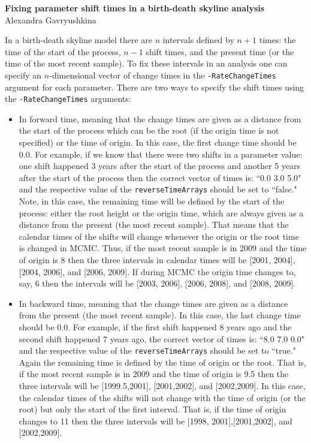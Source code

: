 \documentclass[12pt]{article}
\begin{document}
\begin{center}
\large{\bf Fixing parameter shift times in a birth-death skyline analysis} \\
\vskip2mm 
Alexandra Gavryushkina
\end{center}
\vskip5mm

In a birth-death skyline model \cite{Stadler2013} there are $n$ intervals defined by $n+1$ times: the time of the start of the process, $n-1$ shift times, and the present time (or the time of the most recent sample). To fix these intervals in an analysis one can specify an $n$-dimensional vector of change times in the {\tt -RateChangeTimes} argument for each parameter.  There are two ways to specify the shift times using the {\tt -RateChangeTimes} arguments: 

\begin{itemize}
\item In forward time, meaning that the change times are given as a distance from the start of the process which can be the root (if the origin time is not specified) or the time of origin. In this case, the first change time should be 0.0. For example, if we know that there were two shifts in a parameter value: one shift happened 3 years after the start of the process and another 5 years after the start of the process then the correct vector of times is: ``0.0 3.0 5.0" and the respective value of the {\tt reverseTimeArrays} should be set to ``false." Note, in this case, the remaining time will be defined by the start of the process: either the root height or the origin time, which are always given as a distance from the present (the most recent sample). That means that the calendar times of the shifts will change whenever the origin or the root time is changed in MCMC. Thus, if the most recent sample is in 2009 and the time of origin is 8 then the three intervals in calendar times  will be [2001, 2004], [2004, 2006], and [2006, 2009]. If during MCMC the origin time changes to, say, 6 then the intervals will be [2003, 2006], [2006, 2008], and [2008, 2009].
\item In backward time, meaning that the change times are given as a distance from the present (the most recent sample). In this case, the last change time should be 0.0. For example, if the first shift happened 8 years ago and the second shift happened 7 years ago, the correct vector of times is: ``8.0 7.0 0.0" and the respective value of the {\tt reverseTimeArrays} should be set to ``true." Again the remaining time is defined by the time of origin or the root. That is, if the most recent sample is in 2009 and the time of origin is 9.5 then the three intervals will be [1999.5,2001], [2001,2002], and [2002,2009]. In this case, the calendar times of the shifts will not change with the time of origin (or the root) but only the start of the first interval. That is, if the time of origin changes to 11 then the three intervals will be [1998, 2001],[2001,2002], and [2002,2009].   
\end{itemize}
\end{document}
